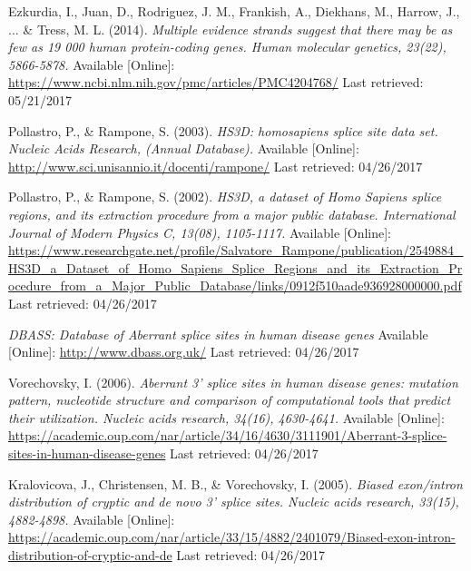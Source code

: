 \documentclass[12pt,a4paper]{article}
\begin{document}
	
    \thispagestyle{empty}
    \newpage
	 
	\begin{thebibliography}{9}
		
		Ezkurdia, I., Juan, D., Rodriguez, J. M., Frankish, A., Diekhans, M., Harrow, J., ... \& Tress, M. L. (2014).
		\textit{Multiple evidence strands suggest that there may be as few as 19 000 human protein-coding genes. Human molecular genetics, 23(22), 5866-5878.}
		Available [Online]: \url{https://www.ncbi.nlm.nih.gov/pmc/articles/PMC4204768/}
		Last retrieved: 05/21/2017		

		Pollastro, P., \& Rampone, S. (2003).
		\textit{ HS3D: homosapiens splice site data set. Nucleic Acids Research, (Annual Database).}
		Available [Online]: \url{ http://www.sci.unisannio.it/docenti/rampone/}
		Last retrieved: 04/26/2017

		Pollastro, P., \& Rampone, S. (2002).
		\textit{ HS3D, a dataset of Homo Sapiens splice regions, and its extraction procedure from a major public database. International Journal of Modern Physics C, 13(08), 1105-1117.}
		Available [Online]: \url{https://www.researchgate.net/profile/Salvatore_Rampone/publication/2549884_HS3D_a_Dataset_of_Homo_Sapiens_Splice_Regions_and_its_Extraction_Procedure_from_a_Major_Public_Database/links/0912f510aade936928000000.pdf}
		Last retrieved: 04/26/2017

		\textit{DBASS: Database of Aberrant splice sites in human disease genes}
		Available [Online]: \url{http://www.dbass.org.uk/}
		Last retrieved: 04/26/2017

		Vorechovsky, I. (2006).
		\textit{Aberrant 3' splice sites in human disease genes: mutation pattern, nucleotide structure and comparison of computational tools that predict their utilization. Nucleic acids research, 34(16), 4630-4641.}
		Available [Online]: \url{https://academic.oup.com/nar/article/34/16/4630/3111901/Aberrant-3-splice-sites-in-human-disease-genes}
		Last retrieved: 04/26/2017

		Kralovicova, J., Christensen, M. B., \& Vorechovsky, I. (2005).
		\textit{ Biased exon/intron distribution of cryptic and de novo 3' splice sites. Nucleic acids research, 33(15), 4882-4898.}
		Available [Online]: \url{https://academic.oup.com/nar/article/33/15/4882/2401079/Biased-exon-intron-distribution-of-cryptic-and-de}
		Last retrieved: 04/26/2017


\end{thebibliography}
\end{document}
